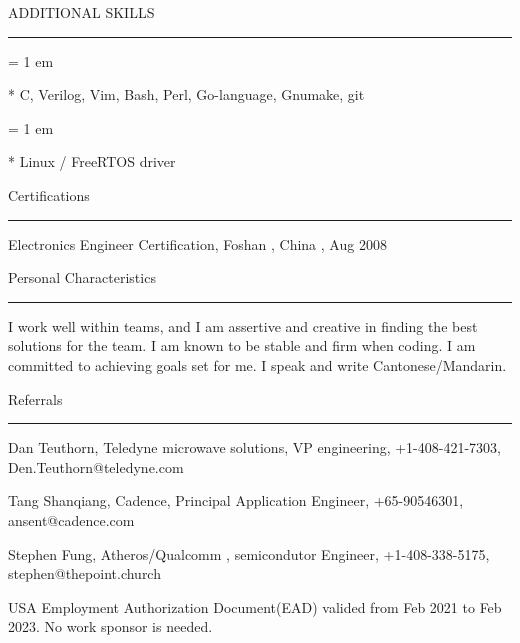{ \medbreak } { \FFdd
ADDITIONAL SKILLS
}
{ \smallbreak } {\par\noindent\hrule} { \smallbreak }
{ \parindent = 1 em \item{*}
 C, Verilog, Vim, Bash, Perl, Go-language, Gnumake, git
 }
{ \parindent = 1 em \item{*}
 Linux / FreeRTOS driver
 }

{ \medbreak } { \FFdd
Certifications
}
{ \smallbreak } {\par\noindent\hrule} { \smallbreak }
Electronics Engineer Certification, Foshan , China , Aug 2008

{ \medbreak } { \FFdd
Personal Characteristics
}
{ \smallbreak } {\par\noindent\hrule} { \smallbreak }
I work well within teams, and I am assertive and creative
    in finding the best solutions for the team.
I am known to be stable and firm when coding.
I am committed to achieving goals set for me.
I speak and write
Cantonese/Mandarin.

{ \medbreak } { \FFdd
Referrals
}
{ \smallbreak } {\par\noindent\hrule} { \smallbreak }

Dan Teuthorn, 
Teledyne microwave solutions, VP engineering,
+1-408-421-7303,
Den.Teuthorn@teledyne.com

Tang Shanqiang,
Cadence,
Principal Application Engineer,
+65-90546301,
ansent@cadence.com

Stephen Fung,
Atheros/Qualcomm , semicondutor Engineer,
+1-408-338-5175,
stephen@thepoint.church



{ \medbreak } 
{ %
USA Employment Authorization Document(EAD) valided from Feb 2021 to Feb 2023.
No work sponsor is needed.
}

\break

\bye
